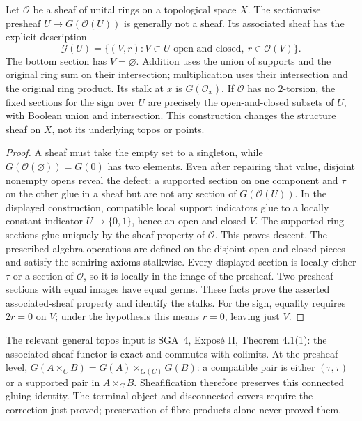 \begin{proposition}
\label{AC-G09}
Let $\mathcal O$ be a sheaf of unital rings on a topological space $X$.
The sectionwise presheaf $U\mapsto G(\mathcal O(U))$ is generally not a
sheaf.  Its associated sheaf has the explicit description
\[
 \mathcal G(U)=\{(V,r):V\subset U\text{ open and closed},\ r\in\mathcal O(V)\}.
\]
The bottom section has $V=\varnothing$.  Addition uses the union of
supports and the original ring sum on their intersection; multiplication
uses their intersection and the original ring product.
Its stalk at $x$ is $G(\mathcal O_x)$.  If $\mathcal O$ has no
$2$-torsion, the fixed sections for the sign over $U$ are precisely the
open-and-closed subsets of $U$, with Boolean union and intersection.
This construction changes the structure sheaf on $X$, not its underlying
topos or points.
\end{proposition}
\begin{proof}
A sheaf must take the empty set to a singleton, while
$G(\mathcal O(\varnothing))=G(0)$ has two elements.  Even after repairing
that value, disjoint nonempty opens reveal the defect: a supported
section on one component and $\tau$ on the other glue in a sheaf but
are not any section of $G(\mathcal O(U))$.
In the displayed construction, compatible local support indicators glue
to a locally constant indicator $U\to\{0,1\}$, hence an open-and-closed
$V$.  The supported ring sections glue uniquely by the sheaf property of
$\mathcal O$.  This proves descent.  The prescribed algebra operations
are defined on the disjoint open-and-closed pieces and satisfy the
semiring axioms stalkwise.  Every displayed section is locally either
$\tau$ or a section of $\mathcal O$, so it is locally in the image of
the presheaf.  Two presheaf sections with equal images have equal germs.
These facts prove the asserted associated-sheaf property and identify
the stalks.  For the sign, equality requires $2r=0$ on $V$; under the
hypothesis this means $r=0$, leaving just $V$.
\end{proof}

The relevant general topos input is SGA~4, Expos\'e II, Theorem 4.1(1):
the associated-sheaf functor is exact and commutes with colimits.
At the presheaf level, $G(A\times_C B)=G(A)\times_{G(C)}G(B)$: a compatible
pair is either $(\tau,\tau)$ or a supported pair in $A\times_C B$.
Sheafification therefore preserves this connected gluing identity.
The terminal object and disconnected covers require the correction just
proved; preservation of fibre products alone never proved them.

